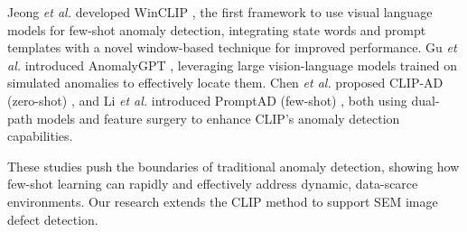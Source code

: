 Jeong \textit{et al.} developed WinCLIP \cite{Jeong_2023_CVPR}, the first framework to use visual language models for few-shot anomaly detection, integrating state words and prompt templates with a novel window-based technique for improved performance. Gu \textit{et al.} introduced AnomalyGPT \cite{gu2024anomalygpt}, leveraging large vision-language models trained on simulated anomalies to effectively locate them.
Chen \textit{et al.} proposed CLIP-AD (zero-shot) \cite{chen2023clip}, and Li \textit{et al.} introduced PromptAD (few-shot) \cite{li2024promptad}, both using dual-path models and feature surgery to enhance CLIP’s anomaly detection capabilities.

These studies push the boundaries of traditional anomaly detection, showing how few-shot learning can rapidly and effectively address dynamic, data-scarce environments. Our research extends the CLIP method to support SEM image defect detection. 

